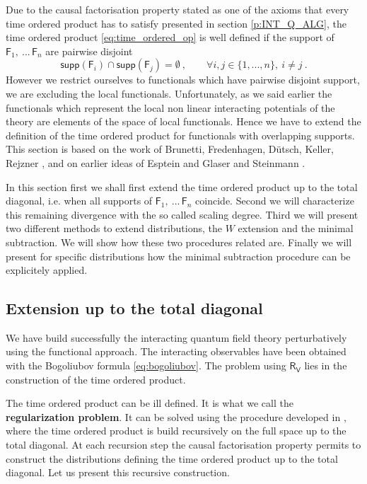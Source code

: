 \documentclass[11pt]{book}
\newcommand{\supp}{\mathsf{supp}}
\newcommand{\Fsf}{\mathsf{F}}
\newcommand{\Rsf}{\mathsf{R}}
\newcommand{\Vsf}{\mathsf{V}}
\theoremstyle{break}
\begin{document}
Due to the causal factorisation property stated as one of the axioms that every time ordered product has to satisfy presented in section \ref{p:INT_Q_ALG}, the time ordered product \eqref{eq:time_ordered_op} is well defined if the support of $\Fsf_1, \ ... \, \Fsf_n$ are pairwise disjoint
%
\begin{equation*}
\supp(\Fsf_i) \cap \supp(\Fsf_j) = \emptyset \ , \qquad \forall i , j \in \{1,...,n\}, \ i \neq j \ . 
\end{equation*}
%
However we restrict ourselves to functionals which have pairwise disjoint support, we are excluding the local functionals. Unfortunately, as we said earlier the functionals which represent the local non linear interacting potentials of the theory are elements of the space of local functionals. Hence we have to extend the definition of the time ordered product for functionals with overlapping supports. This section is based on the work of Brunetti, Fredenhagen, Dütsch, Keller, Rejzner \cite{brunetti_microlocal_2000,duetsch_dimensional_2014}, and on earlier ideas of Esptein and Glaser and Steinmann \cite{epstein_glaser,steinmann_perturbation_1971}.


In this section first we shall first extend the time ordered product up to the total diagonal, i.e. when all supports of $\Fsf_1, \ ... \, \Fsf_n$ coincide. Second we will characterize this remaining divergence with the so called scaling degree. Third we will present two different methods to extend distributions, the $W$ extension and the minimal subtraction. We will show how these two procedures related are. Finally we will present for specific distributions how the minimal subtraction procedure can be explicitely applied.


\subsection{Extension up to the total diagonal}
\label{p:EXT_UP_TOT}


We have build successfully the interacting quantum field theory perturbatively using the functional approach. The interacting observables have been obtained with the Bogoliubov formula \eqref{eq:bogoliubov}. The problem using $\Rsf_\Vsf$ lies in the construction of the time ordered product.


The time ordered product can be ill defined. It is what we call the \textbf{regularization problem}. It can be solved using the procedure developed in \cite{brunetti_microlocal_2000}, where the time ordered product is build recursively on the full space up to the total diagonal. At each recursion step the causal factorisation property permits to construct the distributions defining the time ordered product up to the total diagonal. Let us present this recursive construction. 
\end{document}
